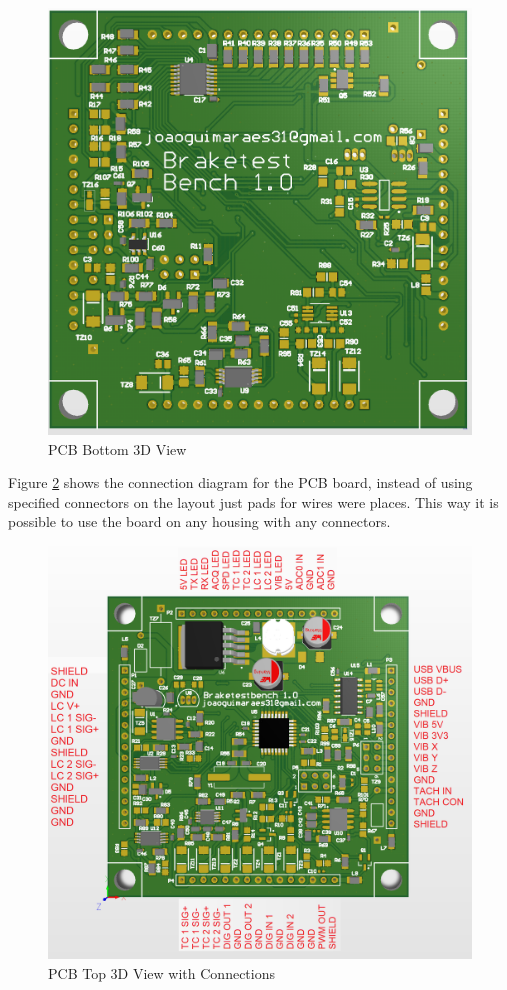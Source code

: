 		\begin{figure}[htbp]
			\centering
			\includegraphics[scale=0.6]{figuras/fig-pcb-print-bottom}
			\caption{PCB Bottom 3D View \cite{pcb-print-bot}}
			\label{fig:pcb-print-bottom}
		\end{figure}

		Figure \ref{fig:pcb-print-con} shows the connection diagram for the PCB board, instead of using specified connectors on the layout just pads for wires were places. This way it is possible to use the board on any housing with any connectors.

		\begin{figure}[htbp]
			\centering
			\includegraphics[scale=0.6]{figuras/fig-pcb-inputs}
			\caption{PCB Top 3D View with Connections \cite{pcb-print-con}}
			\label{fig:pcb-print-con}
		\end{figure}

